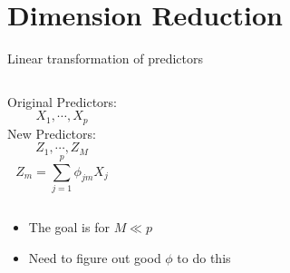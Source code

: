 \documentclass[aspectratio=169,usenames,dvipsnames]{beamer}
\newcommand{\InstructorList}[1]{
\begin{itemize}
	\color{orange}
	#1
\end{itemize}
}
\begin{document}
\section{Dimension Reduction }


\begin{frame}[t]{Linear transformation of predictors }

\begin{columns}
\centering
Original Predictors:
\begin{equation*}
	X_1,\cdots,X_p
\end{equation*}
\centering
New Predictors:
\begin{equation*}
	Z_1,\cdots,Z_M
\end{equation*}
\begin{equation*}
	Z_m = \sum_{j=1}^p \phi_{jm}X_j
\end{equation*}

\end{columns}
\InstructorList{
\item The goal is for $M \ll p$
\item Need to figure out good $\phi$ to do this
}
\end{frame}
\end{document}
